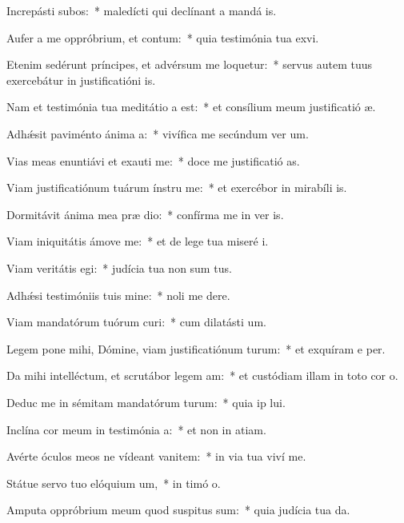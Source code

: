\item Increpásti subos:~* maledícti qui declínant a mandá is.
\item Aufer a me oppróbrium, et contum:~* quia testimónia tua exvi.
\item Etenim sedérunt príncipes, et advérsum me loquetur:~* servus autem tuus exercebátur in justificatióni is.
\item Nam et testimónia tua meditátio a est:~* et consílium meum justificatió æ.
\item Adhǽsit paviménto ánima a:~* vivífica me secúndum ver um.
\item Vias meas enuntiávi et exauti me:~* doce me justificatió as.
\item Viam justificatiónum tuárum ínstru me:~* et exercébor in mirabíli is.
\item Dormitávit ánima mea præ dio:~* confírma me in ver is.
\item Viam iniquitátis ámove  me:~* et de lege tua miseré i.
\item Viam veritátis egi:~* judícia tua non sum tus.
\item Adhǽsi testimóniis tuis mine:~* noli me dere.
\item Viam mandatórum tuórum curi:~* cum dilatásti  um.
\item Legem pone mihi, Dómine, viam justificatiónum turum:~* et exquíram e per.
\item Da mihi intelléctum, et scrutábor legem am:~* et custódiam illam in toto cor o.
\item Deduc me in sémitam mandatórum turum:~* quia ip lui.
\item Inclína cor meum in testimónia a:~* et non in atiam.
\item Avérte óculos meos ne vídeant vanitem:~* in via tua viví me.
\item Státue servo tuo elóquium um,~* in timó o.
\item Amputa oppróbrium meum quod suspitus sum:~* quia judícia tua da.
